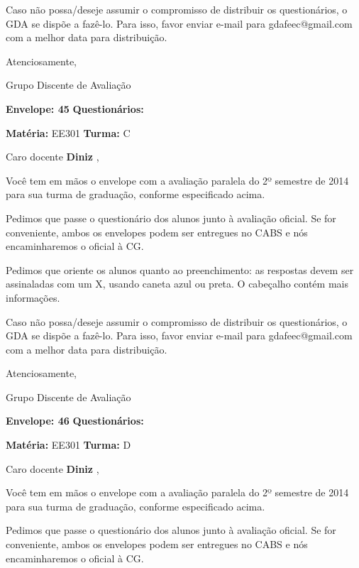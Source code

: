 \documentclass[a5paper]{letter}
\begin{document}
	Caso não possa/deseje assumir o compromisso de distribuir os questionários, o GDA se dispõe a fazê-lo. Para isso, favor enviar e-mail para gdafeec@gmail.com com a melhor data para distribuição.


Atenciosamente, 

Grupo Discente de Avaliação

\vspace{0.5cm}

{\bf Envelope: 45 }		\hfill	{\bf Questionários:} \hspace{2cm}

\newpage
\thispagestyle{empty}

\hfill {\bf Matéria:} EE301 {\bf Turma:} C

Caro docente {\bf Diniz }, 

	Você tem em mãos o envelope com a avaliação paralela do 2º semestre de 2014 para sua turma de graduação, conforme especificado acima.

	Pedimos que passe o questionário dos alunos junto à avaliação oficial. Se for conveniente, ambos os envelopes podem ser entregues no CABS e nós encaminharemos o oficial à CG.

Pedimos que oriente os alunos quanto ao preenchimento: as respostas devem ser assinaladas com um X, usando caneta azul ou preta. O cabeçalho contém mais informações.

	Caso não possa/deseje assumir o compromisso de distribuir os questionários, o GDA se dispõe a fazê-lo. Para isso, favor enviar e-mail para gdafeec@gmail.com com a melhor data para distribuição.


Atenciosamente, 

Grupo Discente de Avaliação

\vspace{0.5cm}

{\bf Envelope: 46 }		\hfill	{\bf Questionários:} \hspace{2cm}

\newpage
\thispagestyle{empty}

\hfill {\bf Matéria:} EE301 {\bf Turma:} D

Caro docente {\bf Diniz }, 

	Você tem em mãos o envelope com a avaliação paralela do 2º semestre de 2014 para sua turma de graduação, conforme especificado acima.

	Pedimos que passe o questionário dos alunos junto à avaliação oficial. Se for conveniente, ambos os envelopes podem ser entregues no CABS e nós encaminharemos o oficial à CG.
\end{document}
